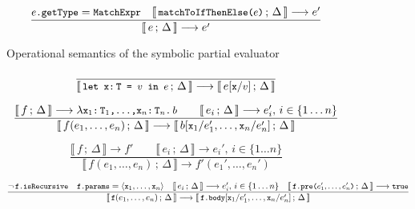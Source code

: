 \documentclass[a4paper,twoside]{article}
\newcommand{\lb}[2]{\llbracket\, #1\,;\, #2\, \rrbracket}
\newcommand{\TODO}[1]{\textcolor{YellowOrange}{(TODO: #1)}} %
\newcommand{\stt}[1]{\texttt{\small{#1}}}
\begin{document}
\begin{figure}[htb]
\begin{framed}
\begin{equation}
\dfrac{
  \stt{$e$.getType} = \stt{MatchExpr} \quad
  \lb{\stt{matchToIfThenElse($e$)}}{\Delta} \longrightarrow e'
}{
  \lb{e}{\Delta} \longrightarrow e'
}
\end{equation}

\end{framed}
\vspace{-10pt}
\caption{Operational semantics of the symbolic partial evaluator \label{fig:symbolicsem}}
\end{figure}


\begin{landscape}
\begin{figure}[htb]\ContinuedFloat
\centering
\begin{framed}

\begin{equation}
\dfrac{
}{
  \lb{\stt{let x:\,T = $v$ in $e$}}{\Delta} \longrightarrow
  \lb{e[\stt{x}/\stt{$v$}]}{\Delta}
}
\end{equation}


\begin{equation}
\dfrac{
  \lb{f}{\Delta} \longrightarrow \lambda \stt{x$_1$:\,T$_1$,\ldots,x$_n$:\,T$_n$.\,$b$}
  \qquad
  \lb{e_i}{\Delta} \longrightarrow e_i',\, i \in \{1 \ldots n\}
}{
  \lb{f(e_1,\ldots,e_n)}{\Delta} \longrightarrow
  \lb{b[\stt{x}_1/e_1',\ldots,\stt{x}_n/e_n']}{\Delta}
}
\end{equation}

\begin{equation}
\dfrac{
  \lb{f}{\Delta} \longrightarrow f' \qquad
  \lb{e_i}{\Delta} \longrightarrow e_i',\, i \in \{1 \ldots n\}
}{
  \lb{f(e_1,\ldots,e_n)}{\Delta} \longrightarrow
  f'(e_1', \ldots, e_n')
}
\end{equation}

\begin{equation}
\dfrac{
 \neg\,\stt{f.isRecursive} \quad
 \stt{f.params} = \langle \stt{x}_1, \ldots, \stt{x}_n \rangle \quad
 \lb{e_i}{\Delta} \longrightarrow e_i',\, i \in \{1 \ldots n\} \quad
 \lb{\stt{f.pre($e_1',\ldots,e_n'$)}}{\Delta} \longrightarrow \stt{true}
}{
  \lb{\stt{f}(e_1,\ldots,e_n)}{\Delta} \longrightarrow
  \lb{\stt{f.body}[\stt{x}_1/e_1',\ldots,\stt{x}_n/e_n']}{\Delta}
}
\label{fig:symbolicsem:fi1}
\end{equation}


\end{framed}
\end{figure}
\end{landscape}
\end{document}

